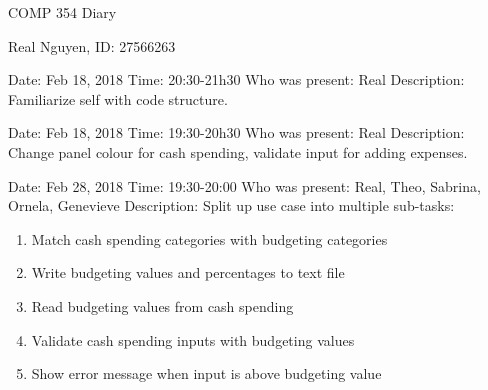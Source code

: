 \documentclass{article}
\begin{document}
 
\begin{center}
    COMP 354 Diary
\end{center}
 
\begin{center}
    Real Nguyen, ID: 27566263
\end{center}
 
\begin{flushleft}
Date: Feb 18, 2018 \newline
Time: 20:30-21h30 \newline
Who was present: Real\newline
Description: Familiarize self with code structure.\newline
\end{flushleft}
 
\begin{flushleft}
Date: Feb 18, 2018 \newline
Time: 19:30-20h30 \newline
Who was present: Real\newline
Description: Change panel colour for cash spending, validate input for adding expenses.\newline
\end{flushleft}
 
\begin{flushleft}
Date: Feb 28, 2018 \newline
Time: 19:30-20:00 \newline
Who was present: Real, Theo, Sabrina, Ornela, Genevieve\newline
Description: Split up use case into multiple sub-tasks:
\begin{enumerate}
  \item Match cash spending categories with budgeting categories
  \item Write budgeting values and percentages to text file
  \item Read budgeting values from cash spending
  \item Validate cash spending inputs with budgeting values
  \item Show error message when input is above budgeting value
\end{enumerate}
\end{flushleft}
 
\end{document}
